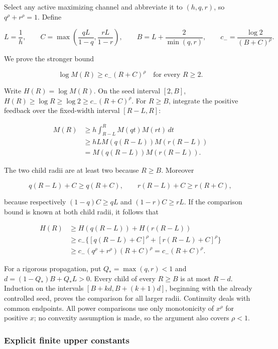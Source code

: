 Select any active maximizing channel and abbreviate it to \((h,q,r)\),
so \(q^\rho+r^\rho=1\). Define

\[
L=\frac1h,\qquad
C=\max\left(\frac{qL}{1-q},\frac{rL}{1-r}\right),\qquad
B=L+\frac2{\min(q,r)},\qquad
c_-=\frac{\log2}{(B+C)^\rho}.
\]

We prove the stronger bound

\[
\boxed{\log M(R)\ge c_-(R+C)^\rho\quad\text{for every }R\ge2.}
\]

Write \(H(R)=\log M(R)\). On the seed interval \([2,B]\),
\(H(R)\ge\log R\ge\log2\ge c_-(R+C)^\rho\). For \(R\ge B\), integrate
the positive feedback over the fixed-width interval \([R-L,R]\):

\[
\begin{aligned}
M(R)&\ge h\int_{R-L}^{R}M(qt)M(rt)\,dt\\
&\ge hL M(q(R-L))M(r(R-L))\\
&=M(q(R-L))M(r(R-L)).
\end{aligned}
\]

The two child radii are at least two because \(R\ge B\). Moreover

\[
q(R-L)+C\ge q(R+C),\qquad
r(R-L)+C\ge r(R+C),
\]

because respectively \((1-q)C\ge qL\) and \((1-r)C\ge rL\). If the
comparison bound is known at both child radii, it follows that

\[
\begin{aligned}
H(R)&\ge H(q(R-L))+H(r(R-L))\\
&\ge c_-\{[q(R-L)+C]^\rho+[r(R-L)+C]^\rho\}\\
&\ge c_-(q^\rho+r^\rho)(R+C)^\rho
=c_-(R+C)^\rho.
\end{aligned}
\]

For a rigorous propagation, put \(Q_* =\max(q,r)<1\) and
\(d=(1-Q_*)B+Q_*L>0\). Every child of every \(R\ge B\) is at most
\(R-d\). Induction on the intervals \([B+kd,B+(k+1)d]\), beginning with
the already controlled seed, proves the comparison for all larger radii.
Continuity deals with common endpoints. All power comparisons use only
monotonicity of \(x^\rho\) for positive \(x\); no convexity assumption
is made, so the argument also covers \(\rho<1\).

\hypertarget{explicit-finite-upper-constants}{%
\subsubsection{Explicit finite upper
constants}\label{explicit-finite-upper-constants}}

